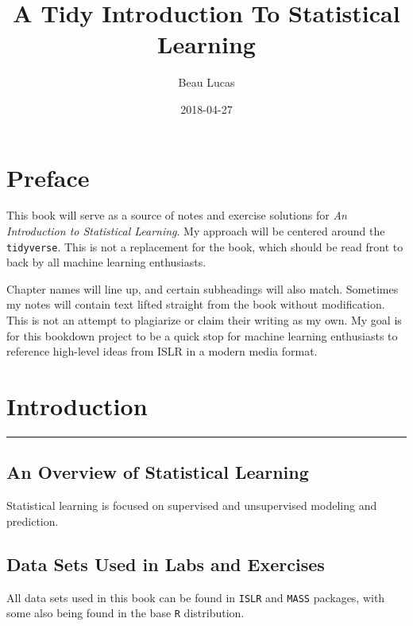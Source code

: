 \documentclass[]{book}
\title{A Tidy Introduction To Statistical Learning}
\author{Beau Lucas}
\date{2018-04-27}
\theoremstyle{definition}
\theoremstyle{definition}
\theoremstyle{definition}
\theoremstyle{remark}
\begin{document}
\maketitle

{
\setcounter{tocdepth}{1}
\tableofcontents
}
\chapter*{Preface}\label{preface}

This book will serve as a source of notes and exercise solutions for
\emph{An Introduction to Statistical Learning}. My approach will be
centered around the \texttt{tidyverse}. This is not a replacement for
the book, which should be read front to back by all machine learning
enthusiasts.

Chapter names will line up, and certain subheadings will also match.
Sometimes my notes will contain text lifted straight from the book
without modification. This is not an attempt to plagiarize or claim
their writing as my own. My goal is for this bookdown project to be a
quick stop for machine learning enthusiasts to reference high-level
ideas from ISLR in a modern media format.

\chapter{Introduction}\label{intro}

\begin{center}\rule{0.5\linewidth}{\linethickness}\end{center}

\section{An Overview of Statistical
Learning}\label{an-overview-of-statistical-learning}

Statistical learning is focused on supervised and unsupervised modeling
and prediction.

\section{Data Sets Used in Labs and
Exercises}\label{data-sets-used-in-labs-and-exercises}

All data sets used in this book can be found in \texttt{ISLR} and
\texttt{MASS} packages, with some also being found in the base
\texttt{R} distribution.
\end{document}
